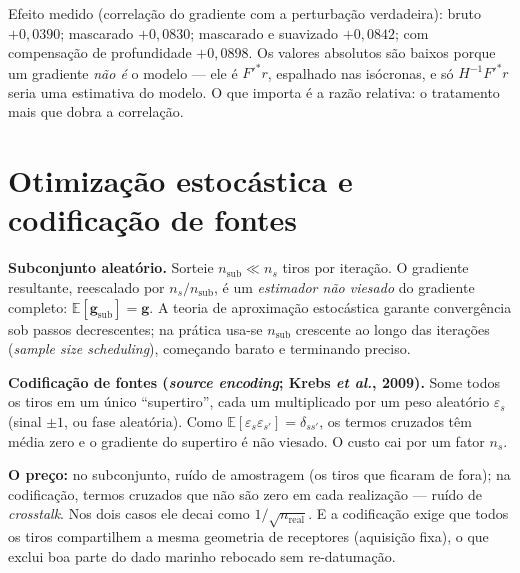 \documentclass[11pt,a4paper,oneside]{report}
\begin{document}
Efeito medido (correla\c{c}\~ao do gradiente com a perturba\c{c}\~ao
verdadeira): bruto $+0{,}0390$; mascarado $+0{,}0830$; mascarado e suavizado
$+0{,}0842$; com compensa\c{c}\~ao de profundidade $+0{,}0898$. Os valores
absolutos s\~ao baixos porque um gradiente \emph{n\~ao \'e} o modelo --- ele
\'e $F'^{*}r$, espalhado nas is\'ocronas, e s\'o $H^{-1}F'^{*}r$ seria uma
estimativa do modelo. O que importa \'e a raz\~ao relativa: o tratamento mais
que dobra a correla\c{c}\~ao.

\section{Otimiza\c{c}\~ao estoc\'astica e codifica\c{c}\~ao de fontes}

\begin{teoria}
\textbf{Subconjunto aleat\'orio.} Sorteie $n_{\text{sub}} \ll n_s$ tiros por
itera\c{c}\~ao. O gradiente resultante, reescalado por $n_s/n_{\text{sub}}$,
\'e um \emph{estimador n\~ao viesado} do gradiente completo:
$\mathbb{E}[\mathbf{g}_{\text{sub}}] = \mathbf{g}$. A
teoria de aproxima\c{c}\~ao estoc\'astica garante converg\^encia sob passos
decrescentes; na pr\'atica usa-se $n_{\text{sub}}$ crescente ao longo das
itera\c{c}\~oes (\emph{sample size scheduling}), come\c{c}ando barato e
terminando preciso.

\textbf{Codifica\c{c}\~ao de fontes (\emph{source encoding}; Krebs \emph{et
al.}, 2009).} Some todos os
tiros em um \'unico ``supertiro'', cada um multiplicado por um peso aleat\'orio
$\varepsilon_s$ (sinal $\pm1$, ou fase aleat\'oria). Como
$\mathbb{E}[\varepsilon_s\varepsilon_{s'}] = \delta_{ss'}$, os termos cruzados
t\^em m\'edia zero e o gradiente do supertiro \'e n\~ao viesado. O custo cai
por um fator $n_s$.

\textbf{O pre\c{c}o:} no subconjunto, ru\'ido de amostragem (os tiros que
ficaram de fora); na codifica\c{c}\~ao, termos cruzados que n\~ao s\~ao zero em
cada realiza\c{c}\~ao --- ru\'ido de \emph{crosstalk}. Nos dois casos ele decai
como $1/\sqrt{n_{\text{real}}}$. E a codifica\c{c}\~ao exige que todos os tiros
compartilhem a mesma geometria de receptores (aquisi\c{c}\~ao fixa), o que
exclui boa parte do dado marinho rebocado sem re-datuma\c{c}\~ao.
\end{teoria}
\end{document}
